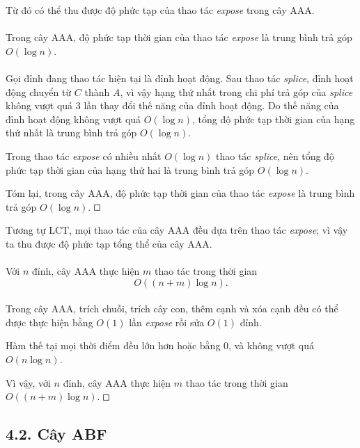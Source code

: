 \documentclass[11pt]{article}
\newcommand{\square}{\mathord{\vcenter{\hrule height .5pt
  \hbox{\vrule width .5pt height 5pt\kern5pt\vrule width .5pt}
  \hrule height .5pt}}}
\begin{document}
Từ đó có thể thu được độ phức tạp của thao tác \emph{expose} trong cây AAA.

\paragraph{}
Trong cây AAA, độ phức tạp thời gian của thao tác \emph{expose} là trung bình
trả góp \(O(\log n)\).

\paragraph{}
Gọi đỉnh đang thao tác hiện tại là đỉnh hoạt động. Sau thao tác
\emph{splice}, đỉnh hoạt động chuyển từ \(C\) thành \(A\), vì vậy hạng thứ
nhất trong chi phí trả góp của \emph{splice} không vượt quá \(3\) lần thay
đổi thế năng của đỉnh hoạt động. Do thế năng của đỉnh hoạt động không vượt
quá \(O(\log n)\), tổng độ phức tạp thời gian của hạng thứ nhất là trung bình
trả góp \(O(\log n)\).

Trong thao tác \emph{expose} có nhiều nhất \(O(\log n)\) thao tác
\emph{splice}, nên tổng độ phức tạp thời gian của hạng thứ hai là trung bình
trả góp \(O(\log n)\).

Tóm lại, trong cây AAA, độ phức tạp thời gian của thao tác \emph{expose} là
trung bình trả góp \(O(\log n)\). \(\square\)

Tương tự LCT, mọi thao tác của cây AAA đều dựa trên thao tác \emph{expose};
vì vậy ta thu được độ phức tạp tổng thể của cây AAA.

\paragraph{}
Với \(n\) đỉnh, cây AAA thực hiện \(m\) thao tác trong thời gian
\[
  O((n+m)\log n).
\]

\paragraph{}
Trong cây AAA, trích chuỗi, trích cây con, thêm cạnh và xóa cạnh đều có thể
được thực hiện bằng \(O(1)\) lần \emph{expose} rồi sửa \(O(1)\) đỉnh.

Hàm thế tại mọi thời điểm đều lớn hơn hoặc bằng \(0\), và không vượt quá
\(O(n\log n)\).

Vì vậy, với \(n\) đỉnh, cây AAA thực hiện \(m\) thao tác trong thời gian
\(O((n+m)\log n)\). \(\square\)

\subsection*{4.2. Cây ABF}
\end{document}
